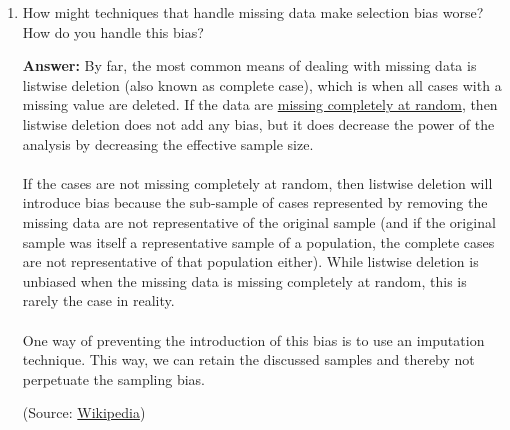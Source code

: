 \documentclass{article}
\newenvironment{QandA}{\begin{enumerate}[label=\arabic*.]}{\end{enumerate}}
\newenvironment{InnerQandA}{\begin{enumerate}[label=\roman*.]}{\end{enumerate}}
\newenvironment{answer}{\par\normalfont \textbf{Answer:}}{}
\begin{document}
\begin{QandA}
\begin{InnerQandA}
        \item How might techniques that handle missing data make selection bias worse? How do you handle this bias?
        \begin{answer}
            By far, the most common means of dealing with missing data is listwise deletion (also known as complete case), which is when all cases with a missing value are deleted. If the data are \href{https://en.wikipedia.org/wiki/Missing_data#Missing_completely_at_random}{missing completely at random}, then listwise deletion does not add any bias, but it does decrease the power of the analysis by decreasing the effective sample size. \\\\
            If the cases are not missing completely at random, then listwise deletion will introduce bias because the sub-sample of cases represented by removing the missing data are not representative of the original sample (and if the original sample was itself a representative sample of a population, the complete cases are not representative of that population either). While listwise deletion is unbiased when the missing data is missing completely at random, this is rarely the case in reality.\\\\
            One way of preventing the introduction of this bias is to use an imputation technique. This way, we can retain the discussed samples and thereby not perpetuate the sampling bias.

            (Source: \href{https://en.wikipedia.org/wiki/Imputation_(statistics)}{Wikipedia})
        \end{answer}
    \end{InnerQandA}


\end{QandA}
\end{document}
